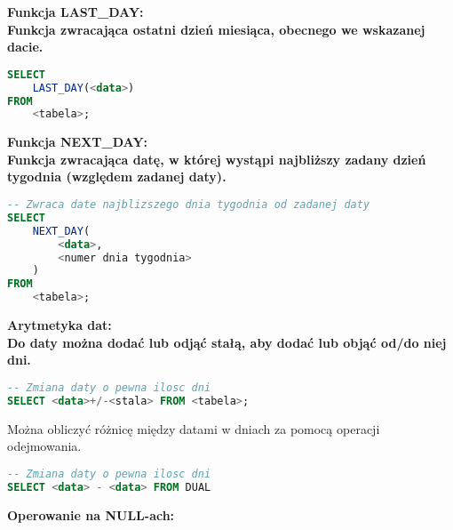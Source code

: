 \documentclass[a4paper,12pt]{article}
\newcommand{\h}[1]{\noindent \bf #1 \rm \\ \noindent}
\begin{document}
\h{Funkcja LAST\_DAY:}
Funkcja zwracająca ostatni dzień miesiąca, obecnego we wskazanej dacie.
\begin{lstlisting}[language=SQL]
SELECT
	LAST_DAY(<data>)
FROM
	<tabela>;
\end{lstlisting}
\vspace{5mm}

\h{Funkcja NEXT\_DAY:}
Funkcja zwracająca datę, w której wystąpi najbliższy zadany dzień tygodnia (względem zadanej daty).
\begin{lstlisting}[language=SQL]
-- Zwraca date najblizszego dnia tygodnia od zadanej daty
SELECT
	NEXT_DAY(
		<data>,
		<numer dnia tygodnia>
	)
FROM
	<tabela>;
\end{lstlisting}
\vspace{5mm}

\h{Arytmetyka dat:}
Do daty można dodać lub odjąć stałą, aby dodać lub objąć od/do niej dni.
\begin{lstlisting}[language=SQL]
-- Zmiana daty o pewna ilosc dni
SELECT <data>+/-<stala> FROM <tabela>;
\end{lstlisting}
\vspace{5mm}

\noindent
Można obliczyć różnicę między datami w dniach za pomocą operacji odejmowania.
\begin{lstlisting}[language=SQL]
-- Zmiana daty o pewna ilosc dni
SELECT <data> - <data> FROM DUAL
\end{lstlisting}
\vspace{5mm}

\newpage
\h{Operowanie na NULL-ach:}
	
\end{document}
